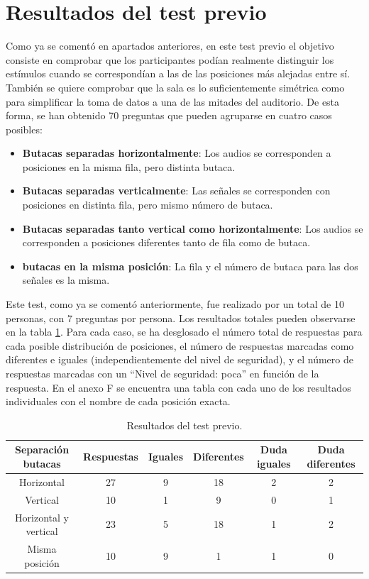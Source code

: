 \documentclass[11pt,a4paper]{book}
\begin{document}
    \section{Resultados del test previo}
        Como ya se comentó en apartados anteriores, en este test previo el objetivo consiste en comprobar que los participantes podían realmente distinguir los estímulos cuando se correspondían a las de las posiciones más alejadas entre sí. También se quiere comprobar que la sala es lo suficientemente simétrica como para simplificar la toma de datos a una de las mitades del auditorio. De esta forma, se han obtenido 70 preguntas que pueden agruparse en cuatro casos posibles: 
        \begin{itemize}
            \item \textbf{Butacas separadas horizontalmente}: Los audios se corresponden a posiciones en la misma fila, pero distinta butaca.
            \item \textbf{Butacas separadas verticalmente}: Las señales se corresponden con posiciones en distinta fila, pero mismo número de butaca.
            \item \textbf{Butacas separadas tanto vertical como horizontalmente}: Los audios se corresponden a posiciones diferentes tanto de fila como de butaca.
            \item \textbf{butacas en la misma posición}: La fila y el número de butaca para las dos señales es la misma.
        \end{itemize}
        Este test, como ya se comentó anteriormente, fue realizado por un total de 10 personas, con 7 preguntas por persona. Los resultados totales pueden observarse en la tabla \ref{tablaTestPrevio}. Para cada caso, se ha desglosado el número total de respuestas para cada posible distribución de posiciones, el número de respuestas marcadas como diferentes e iguales (independientemente del nivel de seguridad), y el número de respuestas marcadas con un ``Nivel de seguridad: poca'' en función de la respuesta. En el anexo F se encuentra una tabla con cada uno de los resultados individuales con el nombre de cada posición exacta.
        
        \begin{table}[H]
			\begin{center}
			\begin{scriptsize}
			\begin{tabular}{| c | c | c | c | c | c |}
			    \hline
				\textbf{Separación butacas}&\textbf{Respuestas}&\textbf{Iguales}&\textbf{Diferentes}&\textbf{Duda iguales}&\textbf{Duda diferentes}\\ \hline
                Horizontal&27&9&18&2&2\\ \hline
                Vertical&10&1&9&0&1\\ \hline
                Horizontal y vertical&23&5&18&1&2\\ \hline
                Misma posición&10&9&1&1&0\\ \hline
			\end{tabular}
			\caption{Resultados del test previo.}
			\label{tablaTestPrevio}
			\end{scriptsize}
			\end{center}	
		\end{table}	
\end{document}
